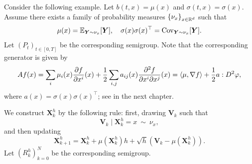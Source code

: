 Consider the following example. Let $b(t,x) = \mu(x)$ and $\sigma(t,x) = \sigma(x)$. Assume there exists a family of probability measures $\left\{\nu_x\right\}_{x\in \mathbb{R}^d}$ such that
\begin{equation*}
    \mu(x) = \mathbb{E}_{\bm{Y} \sim \nu_x}[\bm{Y}],\quad \sigma(x)\sigma(x)^\top = \operatorname{Cov}_{\bm{Y} \sim \nu_x}[\bm{Y}].
\end{equation*}
Let $(P_t)_{t \in [0,T]}$ be the corresponding semigroup. Note that the corresponding generator is given by
\begin{equation*}
    Af(x) = \sum_i \mu_i(x) \frac{\partial f}{\partial x^i}(x) + \frac{1}{2}\sum_{i,j}a_{ij}(x)\frac{\partial^2 f}{\partial x^i\partial x^j}(x) = \left\langle \mu,\nabla f \right\rangle + \frac{1}{2}a : D^2\varphi,
\end{equation*}
where $a(x) = \sigma(x)\sigma(x)^\top$; see in the next chapter.

We construct $\bm{X}^h_k$ by the following rule: first, drawing $\bm{V}_k$ such that
\begin{equation*}
    \bm{V}_k \mid \bm{X}^h_k = x ~\sim~\nu_x,
\end{equation*}
and then updating
\begin{equation*}
    \bm{X}^h_{k+1} = \bm{X}^h_k + \mu(\bm{X}^h_k)h + \sqrt{h}(\bm{V}_k - \mu(\bm{X}^h_k)).
\end{equation*}
Let $(R^h_k)_{k=0}^N$ be the corresponding semigroup.

